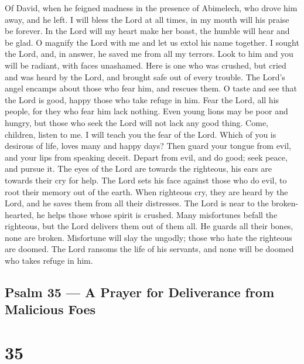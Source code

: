Of David, when he feigned madness in the presence of Abimelech, who
drove him away, and he left.  I will bless the Lord at all
times, in my mouth will his praise be forever.  In the Lord
will my heart make her boast, the humble will hear and be glad.
 O magnify the Lord with me and let us extol his name
together.  I sought the Lord, and, in answer, he saved me
from all my terrors.  Look to him and you will be radiant,
with faces unashamed.  Here is one who was crushed, but
cried and was heard by the Lord, and brought safe out of every trouble.
 The Lord's angel encamps about those who fear him, and
rescues them.  O taste and see that the Lord is good, happy
those who take refuge in him.  Fear the Lord, all his
people, for they who fear him lack nothing.  Even young
lions may be poor and hungry, but those who seek the Lord will not lack
any good thing.  Come, children, listen to me. I will teach
you the fear of the Lord.  Which of you is desirous of
life, loves many and happy days?  Then guard your tongue
from evil, and your lips from speaking deceit.  Depart from
evil, and do good; seek peace, and pursue it.  The eyes of
the Lord are towards the righteous, his ears are towards their cry for
help.  The Lord sets his face against those who do evil, to
root their memory out of the earth.  When righteous cry,
they are heard by the Lord, and he saves them from all their distresses.
 The Lord is near to the broken-hearted, he helps those
whose spirit is crushed.  Many misfortunes befall the
righteous, but the Lord delivers them out of them all.  He
guards all their bones, none are broken.  Misfortune will
slay the ungodly; those who hate the righteous are doomed. 
The Lord ransoms the life of his servants, and none will be doomed who
takes refuge in him.

\hypertarget{psalm-35-a-prayer-for-deliverance-from-malicious-foes}{%
\subsection{Psalm 35 --- A Prayer for Deliverance from Malicious
Foes}\label{psalm-35-a-prayer-for-deliverance-from-malicious-foes}}

\hypertarget{section-34}{%
\section{35}\label{section-34}}

